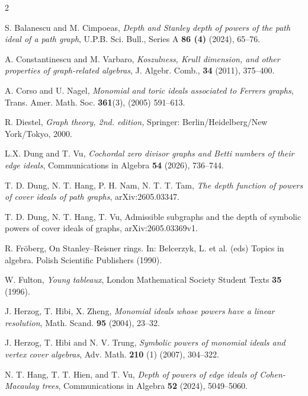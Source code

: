 \documentclass[12pt,amscd]{amsart}
\theoremstyle{definition}
\numberwithin{equation}{section}
\begin{document}
  

\begin{thebibliography}{2}


 S. Balanescu and M. Cimpoeas, \emph{Depth and Stanley depth of powers of the path ideal of a path graph}, U.P.B. Sci. Bull., Series A {\bf 86 (4)} (2024), 65--76.


  A. Constantinescu and M. Varbaro, {\it Koszulness, Krull dimension, and other properties of graph-related algebras},  J. Algebr. Comb., {\bf 34} (2011), 375--400.

 A. Corso and U. Nagel, \emph{Monomial and toric ideals associated to Ferrers graphs},  Trans. Amer. Math. Soc. {\bf 361}(3), (2005) 591--613.
 
 

 R. Diestel, \emph{Graph theory, 2nd. edition,} Springer: Berlin/Heidelberg/New York/Tokyo, 2000.
 

 L.X. Dung and T. Vu,
{\em Cochordal zero divisor graphs and Betti numbers of their edge ideals}, Communications in Algebra {\bf 54} (2026), 736--744.

 T. D. Dung, N. T. Hang, P. H. Nam, N. T. T. Tam, {\it The depth  function of powers of cover ideals of path graphs}, arXiv:2605.03347.

 T. D. Dung, N. T. Hang, T. Vu, Admissible subgraphs and the depth of symbolic powers of cover ideals of graphs, arXiv:2605.03369v1.


R. Fr\"oberg,  On Stanley–Reisner rings. In: Belcerzyk, L. et al. (eds) Topics
in algebra. Polish Scientific Publishers (1990). 


W. Fulton, 
{\em Young tableaux}, London Mathematical Society Student Texts {\bf 35} (1996).



J. Herzog, T. Hibi, X. Zheng, 
{\em Monomial ideals whose powers have a
linear resolution}, Math. Scand. {\bf 95} (2004), 23--32. 

  J. Herzog, T. Hibi and N. V. Trung, {\em Symbolic powers of monomial ideals and vertex cover algebras}, Adv. Math. {\bf 210} (1) (2007), 304--322. 


 N. T. Hang, T. T. Hien, and T. Vu, {\it Depth of powers of edge ideals of Cohen-Macaulay trees},  Communications in Algebra {\bf 52} (2024), 5049--5060.


\end{thebibliography}
\end{document}
